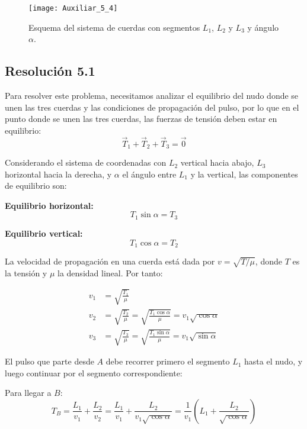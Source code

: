 \documentclass[
  11pt,
  letterpaper,
   addpoints,
  ]{exam}
\begin{document}
\begin{questions}
\begin{figure}[h]
    \centering
    \texttt{[image: Auxiliar\_5\_4]}
    \caption{Esquema del sistema de cuerdas con segmentos $L_1$, $L_2$ y $L_3$ y ángulo $\alpha$.}
    \label{fig:cuerdas}
\end{figure}

\begin{solution}

\subsection*{Resolución 5.1}

Para resolver este problema, necesitamos analizar el equilibrio del nudo donde se unen las tres cuerdas y las condiciones de propagación del pulso, por lo que en el punto donde se unen las tres cuerdas, las fuerzas de tensión deben estar en equilibrio:
\begin{equation}
\vec{T}_1 + \vec{T}_2 + \vec{T}_3 = \vec{0}
\end{equation}

Considerando el sistema de coordenadas con $L_2$ vertical hacia abajo, $L_3$ horizontal hacia la derecha, y $\alpha$ el ángulo entre $L_1$ y la vertical, las componentes de equilibrio son:

\textbf{Equilibrio horizontal:}
\begin{equation}
T_1 \sin\alpha = T_3
\end{equation}

\textbf{Equilibrio vertical:}
\begin{equation}
T_1 \cos\alpha = T_2
\end{equation}

La velocidad de propagación en una cuerda está dada por $v = \sqrt{T/\mu}$, donde $T$ es la tensión y $\mu$ la densidad lineal. Por tanto:

\begin{align}
v_1 &= \sqrt{\frac{T_1}{\mu}} \\
v_2 &= \sqrt{\frac{T_2}{\mu}} = \sqrt{\frac{T_1 \cos\alpha}{\mu}} = v_1\sqrt{\cos\alpha} \\
v_3 &= \sqrt{\frac{T_3}{\mu}} = \sqrt{\frac{T_1 \sin\alpha}{\mu}} = v_1\sqrt{\sin\alpha}
\end{align}

El pulso que parte desde $A$ debe recorrer primero el segmento $L_1$ hasta el nudo, y luego continuar por el segmento correspondiente:

Para llegar a $B$:
\begin{equation}
T_B = \frac{L_1}{v_1} + \frac{L_2}{v_2} = \frac{L_1}{v_1} + \frac{L_2}{v_1\sqrt{\cos\alpha}} = \frac{1}{v_1}\left(L_1 + \frac{L_2}{\sqrt{\cos\alpha}}\right)
\end{equation}


\end{solution}
\end{questions}
\end{document}
